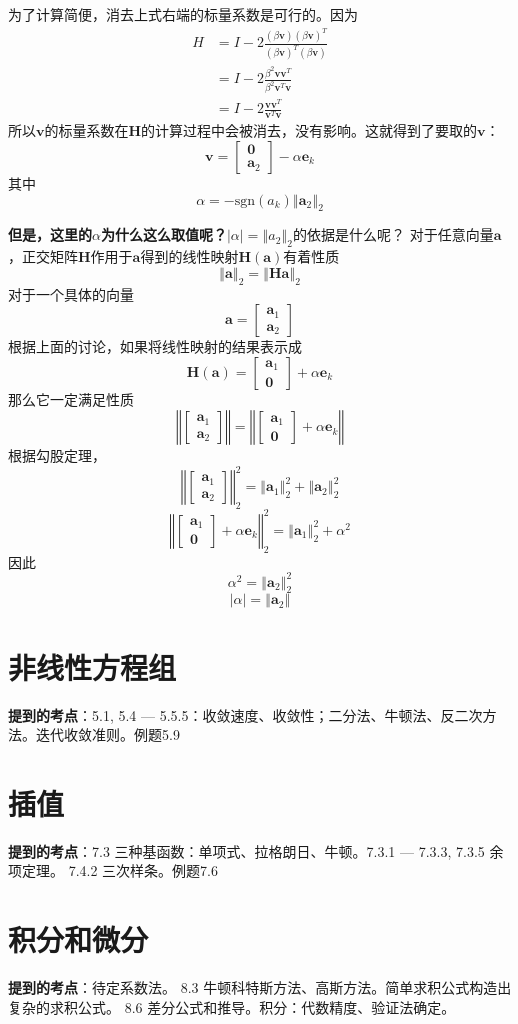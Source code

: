 \documentclass[14pt, letterpaper, UTF8, fontset=windowsnew, heading=true]{article}
\providecommand{\abs}[1]{\left\vert#1\right\vert}
\providecommand{\norm}[1]{\left\Vert#1\right\Vert}
\begin{document}
为了计算简便，消去上式右端的标量系数是可行的。因为
$$ \begin{aligned} H &=I-2 \frac{(\beta \bm{v})( \beta \bm{v})^T} {( \beta \bm{v})^T 
(\beta \bm{v})} \\ &=I-2\frac{\beta ^2 \bm{v} \bm{v}^T}{\beta ^2 \bm{v}^T 
\bm{v}} \\ &= I-2\frac{ \bm{v} \bm{v}^T}{ \bm{v}^T  \bm{v}} \end{aligned} $$
所以$\bm{v}$的标量系数在$\bm{H}$的计算过程中会被消去，没有影响。这就得到了要取的$\bm{v}$：
$$\bm{v}=\begin{bmatrix}\bm{0}\\ \bm{a}_2\end{bmatrix}-\alpha \bm{e}_k$$
其中
$$\alpha=-\text{sgn} (a_k)\norm{\bm{a}_2}_2$$
\par
\textbf{但是，这里的$\alpha$为什么这么取值呢？}$\abs{\alpha}=\norm{a_2}_2$的依据是什么呢？
对于任意向量$\bm{a}$，正交矩阵$\bm{H}$作用于$\bm{a}$得到的线性映射$\bm{H}(\bm{a})$有着性质
$$\norm{\bm{a}}_2=\norm{\bm{Ha}}_2$$
对于一个具体的向量
$$\bm{a}=\begin{bmatrix}\bm{a}_1\\ \bm{a}_2\end{bmatrix}$$
根据上面的讨论，如果将线性映射的结果表示成
$$\bm{H}(\bm{a})=\begin{bmatrix}\bm{a}_1\\ \bm{0}\end{bmatrix} + \alpha \bm{e}_k$$
那么它一定满足性质
$$\norm{\begin{bmatrix}\bm{a}_1\\ \bm{a}_2\end{bmatrix}}=\norm{\begin{bmatrix}\bm{a}_1\\ \bm{0}\end{bmatrix} + \alpha \bm{e}_k}$$
根据勾股定理，
$$\norm{\begin{bmatrix}\bm{a}_1\\ \bm{a}_2\end{bmatrix}}_2^2=\norm{\bm{a}_1}_2^2+\norm{\bm{a}_2}_2^2$$
$$\norm{\begin{bmatrix}\bm{a}_1\\ \bm{0}\end{bmatrix} + \alpha \bm{e}_k}_2^2=\norm{\bm{a}_1}_2^2 + \alpha^2$$
因此
$$\alpha^2=\norm{\bm{a}_2}_2^2$$
$$\abs{\alpha}=\norm{\bm{a}_2}$$

\section{非线性方程组}

\textbf{提到的考点}：5.1, 5.4 --- 5.5.5：收敛速度、收敛性；二分法、牛顿法、反二次方法。迭代收敛准则。例题5.9

\section{插值}

\textbf{提到的考点}：7.3 三种基函数：单项式、拉格朗日、牛顿。7.3.1 --- 7.3.3, 7.3.5 余项定理。
7.4.2 三次样条。例题7.6

\section{积分和微分}

\textbf{提到的考点}：待定系数法。 8.3 牛顿科特斯方法、高斯方法。简单求积公式构造出复杂的求积公式。
8.6 差分公式和推导。积分：代数精度、验证法确定。
	
\end{document}
